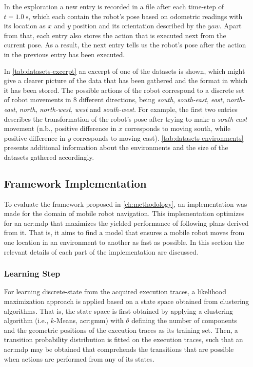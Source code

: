 In the exploration a new entry is recorded in a file after each time-step of $t = \SI{1.0}{\second}$, which each contain the robot's pose based on odometric readings with its location as $x$ and $y$ position and its orientation described by the $yaw$.
Apart from that, each entry also stores the action that is executed next from the current pose.
As a result, the next entry tells us the robot's pose after the action in the previous entry has been executed.

In \autoref{tab:datasets-excerpt} an excerpt of one of the datasets is shown, which might give a clearer picture of the data that has been gathered and the format in which it has been stored.
The possible actions of the robot correspond to a discrete set of robot movements in $8$ different directions, being \textit{south}, \textit{south-east}, \textit{east}, \textit{north-east}, \textit{north}, \textit{north-west}, \textit{west} and \textit{south-west}.
For example, the first two entries describes the transformation of the robot's pose after trying to make a \textit{south-east} movement (n.b., positive difference in $x$ corresponds to moving south, while positive difference in $y$ corresponds to moving east).
\autoref{tab:datasets-environments} presents additional information about the environments and the size of the datasets gathered accordingly.


\subsection{Framework Implementation}
\label{sec:implementation}

To evaluate the framework proposed in \autoref{ch:methodology}, an implementation was made for the domain of mobile robot navigation.
This implementation optimizes for an \acrshort{acr:mdp} that maximizes the yielded performance of following plans derived from it. That is, it aims to find a model that ensures a mobile robot moves from one location in an environment to another as fast as possible.
In this section the relevant details of each part of the implementation are discussed.

\subsubsection{Learning Step}

For learning discrete-state  from the acquired execution traces, a likelihood maximization approach is applied based on a state space obtained from clustering algorithms.
That is, the state space is first obtained by applying a clustering algorithm (i.e., $k$-Means, \acrshort{acr:gmm}) with $\theta$ defining the number of components and the geometric positions of the execution traces as its training set.
Then, a transition probability distribution is fitted on the execution traces, such that an \acrshort{acr:mdp} may be obtained that comprehends the transitions that are possible when actions are performed from any of its states.

